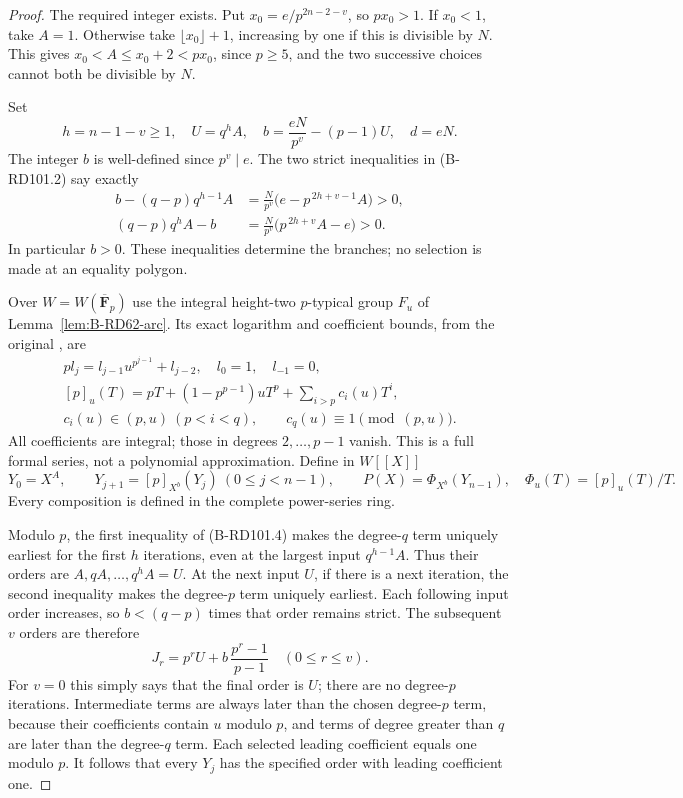 \begin{proof}
The required integer exists. Put
$x_0=e/p^{2n-2-v}$, so $px_0>1$.
If $x_0<1$, take $A=1$.
Otherwise take $\lfloor x_0\rfloor+1$, increasing by one
if this is divisible by $N$. This gives
$x_0<A\le x_0+2<px_0$, since $p\ge5$, and the
two successive choices cannot both be divisible by $N$.

Set
\[
 h=n-1-v\ge1,\quad U=q^hA,\quad
 b=\frac{eN}{p^v}-(p-1)U,\quad d=eN .
                                                        \tag{B-RD101.3}
\]
The integer $b$ is well-defined since $p^v\mid e$.
The two strict inequalities in (B-RD101.2) say exactly
\[
\begin{split}
 b-(q-p)q^{h-1}A
     &=\frac{N}{p^v}\bigl(e-p^{\,2h+v-1}A\bigr)>0,\\
 (q-p)q^hA-b
     &=\frac{N}{p^v}\bigl(p^{\,2h+v}A-e\bigr)>0 .
\end{split}                                             \tag{B-RD101.4}
\]
In particular $b>0$. These inequalities determine the
branches; no selection is made at an equality polygon.

Over $W=W(\overline{\mathbf F}_p)$ use the integral
height-two $p$-typical group $F_u$ of
Lemma~\ref{lem:B-RD62-arc}. Its exact logarithm and
coefficient bounds, from the original
\cite[equations (5.3)--(5.5), Proposition~5.7 and
(12.3)--(12.5)]{HopkinsGross1994Bundles}, are
\[
\begin{gathered}
 p l_j=l_{j-1}u^{p^{j-1}}+l_{j-2},\quad
 l_0=1,\quad l_{-1}=0,\\
 [p]_u(T)=pT+(1-p^{p-1})uT^p+\sum_{i>p}c_i(u)T^i,\\
 c_i(u)\in(p,u)\ (p<i<q),\qquad
 c_q(u)\equiv1\pmod{(p,u)} .
\end{gathered}                                           \tag{B-RD101.5}
\]
All coefficients are integral; those in degrees
$2,\ldots,p-1$ vanish. This is a full formal series,
not a polynomial approximation.
Define in $W[[X]]$
\[
 Y_0=X^A,\qquad Y_{j+1}=[p]_{X^b}(Y_j)
       \ (0\le j<n-1),\qquad
 P(X)=\Phi_{X^b}(Y_{n-1}),\quad\Phi_u(T)=[p]_u(T)/T .
                                                        \tag{B-RD101.6}
\]
Every composition is defined in the complete power-series ring.

Modulo $p$, the first inequality of (B-RD101.4) makes
the degree-$q$ term uniquely earliest for the first $h$
iterations, even at the largest input $q^{h-1}A$.
Thus their orders are $A,qA,\ldots,q^hA=U$.
At the next input $U$, if there is a next iteration,
the second inequality makes the degree-$p$ term
uniquely earliest. Each following input order increases,
so $b<(q-p)$ times that order remains strict.
The subsequent $v$ orders are therefore
\[
 J_r=p^rU+b\,\frac{p^r-1}{p-1}
                  \quad(0\le r\le v).                 \tag{B-RD101.7}
\]
For $v=0$ this simply says that the final order is $U$;
there are no degree-$p$ iterations. Intermediate terms
are always later than the chosen degree-$p$ term, because
their coefficients contain $u$ modulo $p$, and terms
of degree greater than $q$ are later than the degree-$q$
term. Each selected leading coefficient equals one
modulo $p$. It follows that every $Y_j$ has the
specified order with leading coefficient one.


\end{proof}
